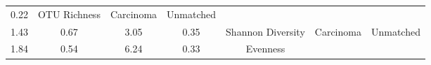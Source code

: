 \documentclass[12pt,]{article}
\begin{document}
\begin{longtable}[]{@{}ccccccc@{}}
\begin{minipage}[t]{0.07\columnwidth}
0.22\strut
\end{minipage} & \begin{minipage}[t]{0.14\columnwidth}\centering\strut
OTU Richness\strut
\end{minipage} & \begin{minipage}[t]{0.09\columnwidth}\centering\strut
Carcinoma\strut
\end{minipage} & \begin{minipage}[t]{0.11\columnwidth}\centering\strut
Unmatched\strut
\end{minipage}\tabularnewline
\begin{minipage}[t]{0.09\columnwidth}\centering\strut
1.43\strut
\end{minipage} & \begin{minipage}[t]{0.16\columnwidth}\centering\strut
0.67\strut
\end{minipage} & \begin{minipage}[t]{0.16\columnwidth}\centering\strut
3.05\strut
\end{minipage} & \begin{minipage}[t]{0.07\columnwidth}\centering\strut
0.35\strut
\end{minipage} & \begin{minipage}[t]{0.14\columnwidth}\centering\strut
Shannon Diversity\strut
\end{minipage} & \begin{minipage}[t]{0.09\columnwidth}\centering\strut
Carcinoma\strut
\end{minipage} & \begin{minipage}[t]{0.11\columnwidth}\centering\strut
Unmatched\strut
\end{minipage}\tabularnewline
\begin{minipage}[t]{0.09\columnwidth}\centering\strut
1.84\strut
\end{minipage} & \begin{minipage}[t]{0.16\columnwidth}\centering\strut
0.54\strut
\end{minipage} & \begin{minipage}[t]{0.16\columnwidth}\centering\strut
6.24\strut
\end{minipage} & \begin{minipage}[t]{0.07\columnwidth}\centering\strut
0.33\strut
\end{minipage} & \begin{minipage}[t]{0.14\columnwidth}\centering\strut
Evenness\strut
\end{minipage} & \begin{minipage}[t]{0.09\columnwidth}\centering\strut

\end{minipage}
\end{longtable}
\end{document}
